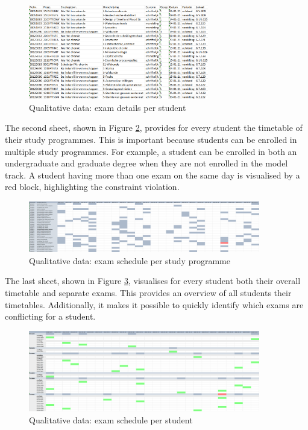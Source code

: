 \begin{figure}[H]
	\centering
	\includegraphics[width=0.7\textwidth]{images/excel/excel_sheet1.png} 
	\caption{Qualitative data: exam details per student}
	\label{fig:sheet1}
\end{figure}

The second sheet, shown in Figure \ref{fig:sheet2}, provides for every student the timetable of their study programmes. This is important because students can be enrolled in multiple study programmes. For example, a student can be enrolled in both an undergraduate and graduate degree when they are not enrolled in the model track. A student having more than one exam on the same day is visualised by a red block, highlighting the constraint violation.

\begin{figure}[H]
	\centering
	\includegraphics[width=0.9\textwidth]{images/excel/excel_sheet2.png} 
	\caption{Qualitative data: exam schedule per study programme}
	\label{fig:sheet2}
\end{figure}

The last sheet, shown in Figure \ref{fig:sheet3}, visualises for every student both their overall timetable and separate exams. This provides an overview of all students their timetables. Additionally, it makes it possible to quickly identify which exams are conflicting for a student.

\begin{figure}[H]
	\centering
	\includegraphics[width=0.9\textwidth]{images/excel/excel_sheet3.png} 
	\caption{Qualitative data: exam schedule per student}
	\label{fig:sheet3}
\end{figure}

